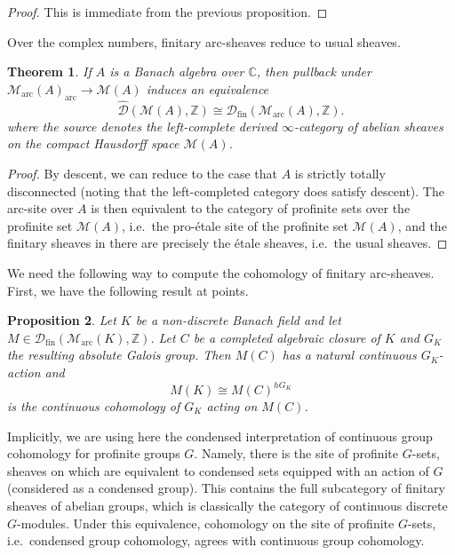 \documentclass[11pt]{amsart}
\numberwithin{equation}{section}
\newtheorem{theorem}{Theorem}
\numberwithin{theorem}{section}
\newtheorem{proposition}[theorem]{Proposition}
\theoremstyle{definition}
\begin{document}
\begin{proof} This is immediate from the previous proposition.
\end{proof}

Over the complex numbers, finitary arc-sheaves reduce to usual sheaves.

\begin{theorem}\label{thm:archimedeanfinitary} If $A$ is a Banach algebra over $\mathbb C$, then pullback under $\mathcal M_{\mathrm{arc}}(A)_{\mathrm{arc}}\to \mathcal M(A)$ induces an equivalence
\[
\widehat{\mathcal D}(\mathcal M(A),\mathbb Z)\cong \mathcal D_{\mathrm{fin}}(\mathcal M_{\mathrm{arc}}(A),\mathbb Z).
\]
where the source denotes the left-complete derived $\infty$-category of abelian sheaves on the compact Hausdorff space $\mathcal M(A)$.
\end{theorem}

\begin{proof} By descent, we can reduce to the case that $A$ is strictly totally disconnected (noting that the left-completed category does satisfy descent). The arc-site over $A$ is then equivalent to the category of profinite sets over the profinite set $\mathcal M(A)$, i.e.~the pro-\'etale site of the profinite set $\mathcal M(A)$, and the finitary sheaves in there are precisely the \'etale sheaves, i.e.~the usual sheaves.
\end{proof}

We need the following way to compute the cohomology of finitary arc-sheaves. First, we have the following result at points.

\begin{proposition} Let $K$ be a non-discrete Banach field and let $M\in \mathcal D_{\mathrm{fin}}(\mathcal M_{\mathrm{arc}}(K),\mathbb Z)$. Let $C$ be a completed algebraic closure of $K$ and $G_K$ the resulting absolute Galois group. Then $M(C)$ has a natural continuous $G_K$-action and
\[
M(K)\cong M(C)^{hG_K}
\]
is the continuous cohomology of $G_K$ acting on $M(C)$.
\end{proposition}

Implicitly, we are using here the condensed interpretation of continuous group cohomology for profinite groups $G$. Namely, there is the site of profinite $G$-sets, sheaves on which are equivalent to condensed sets equipped with an action of $G$ (considered as a condensed group). This contains the full subcategory of finitary sheaves of abelian groups, which is classically the category of continuous discrete $G$-modules. Under this equivalence, cohomology on the site of profinite $G$-sets, i.e.~condensed group cohomology, agrees with continuous group cohomology.
\end{document}
